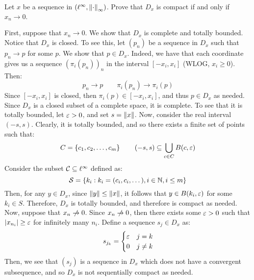 \newpage
\label{q20}
\begin{qu}[num=20]
    Let $ x $ be a sequence in $ (\ell^{\infty}, \left\|\cdot\right\|_{\infty}) $.
    Prove that $ D_{x} $ is compact if and only if $ x_{n} \rightarrow 0 $.
\end{qu}

\begin{soln}
    First, suppose that $ x_{n} \rightarrow 0 $.
    We show that $ D_{x} $ is complete and totally bounded. \vsp
    Notice that $ D_{x} $ is closed. To see this, let $ (p_{n}) $ be a sequence
    in $ D_{x} $ such that $ p_{n} \rightarrow p $ for some $ p $. We show that
    $ p \in D_{x} $. Indeed, we have that each coordinate gives us a sequence
    $ (\pi_{i}(p_{n}))_{n} $ in the interval $ [-x_{i}, x_{i}] $ (WLOG,
    $ x_{i} \geq 0 $). Then:
    \begin{equation*}
        p_{n}\rightarrow p \qquad \pi_{i}(p_{n}) \rightarrow \pi_{i}(p)
    \end{equation*}
    Since $ [-x_{i}, x_{i}] $ is closed, then $ \pi_{i}(p) \in [-x_{i}, x_{i}] $,
    and thus $ p \in D_{x} $ as needed. \vsp
    Since $ D_{x} $ is a closed subset of a complete space, it is complete.
    To see that it is totally bounded, let $ \operatorname{\varepsilon} > 0 $, and set $ s = \left\|x\right\| $.
    Now, consider the real interval $ (-s, s) $. Clearly, it is totally bounded,
    and so there exists a finite set of points such that:
    \begin{equation*}
        C = \set{c_{1}, c_{2}, \dots, c_{m}} \qquad
        (-s, s) \subseteq \bigcup_{c \in C} B(c, \ep)
        \vspace{-0.2in} %
    \end{equation*}
    Consider the subset $ \mathcal{C} \subseteq \ell^{\infty} $ defined as:
    \begin{equation*}
        \mathcal{S} = \left\{{k_{i} : k_{i} = (c_{i}, c_{i}, \dots), i \in \mathbb{N},
        i \leq m}\right\}
    \end{equation*}
    Then, for any $ y \in D_{x} $, since $ \left\|y\right\| \leq \left\|x\right\| $, it follows
    that $ y \in B(k_{i}, \operatorname{\varepsilon}) $ for some $ k_{i} \in S $.
    Therefore, $ D_{x} $ is totally bounded, and therefore is compact as needed.
    \vsp
    Now, suppose that $ x_{n} \cnot\rightarrow 0 $.
    Since $ x_{n} \cnot\rightarrow 0 $, then there exists some $ \operatorname{\varepsilon} > 0 $ such
    that $ \abs{x_{n_{i}}} \geq \operatorname{\varepsilon} $ for infinitely many $ n_{i} $.
    Define a sequence $ s_{j} \in D_{x} $ as:
    \begin{equation*}
        s_{j_{k}} = \begin{cases} \operatorname{\varepsilon} & j = k \\ 0 & j \neq k \end{cases}
    \end{equation*}
    Then, we see that $ (s_{j}) $ is a sequence in $ D_{x} $ which does not have
    a convergent subsequence, and so $ D_{x} $ is not sequentially compact
    as needed.
\end{soln}


